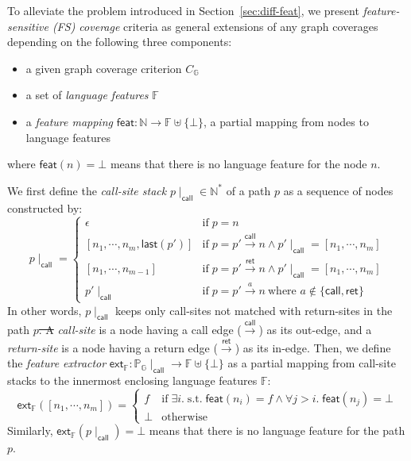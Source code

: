 \documentclass[acmsmall,review,screen]{acmart}
\newcommand{\tif}{\text{if} \; }
\newcommand{\telse}{\text{otherwise}}
\newcommand{\tst}{{\; \text{s.t.} \; }}
\newcommand{\name}[1]{\textsf{#1}}
\newcommand{\graph}{\mathbb{G}}
\newcommand{\nodeset}{\mathbb{N}}
\newcommand{\node}{n}
\newcommand{\edge}[1]{\xrightarrow{#1}}
\newcommand{\call}{\edge{\name{call}}}
\newcommand{\ret}{\edge{\name{ret}}}
\newcommand{\annot}{a}
\newcommand{\patset}[1]{\mathbb{P}_{#1}}
\newcommand{\pat}{p}
\newcommand{\getlast}{\name{last}}
\newcommand{\cov}[1]{C_{#1}}
\newcommand{\featset}{\mathbb{F}}
\newcommand{\feat}{f}
\newcommand{\featmap}{\name{feat}}
\newcommand{\extfeat}{\name{ext}_\featset}
\newcommand{\css}[1]{{#1}\!\mid_{\name{call}}}
\providecommand{\DIFaddtex}[1]{{\protect\color{blue}\uwave{#1}}} %
\providecommand{\DIFdeltex}[1]{{\protect\color{red}\sout{#1}}}                      %
\providecommand{\DIFaddbegin}{} %
\providecommand{\DIFaddend}{} %
\providecommand{\DIFdelbegin}{} %
\providecommand{\DIFdelend}{} %
\providecommand{\DIFadd}[1]{\texorpdfstring{\DIFaddtex{#1}}{#1}} %
\providecommand{\DIFdel}[1]{\texorpdfstring{\DIFdeltex{#1}}{}} %
\newcommand{\DIFscaledelfig}{0.5}
\newlength{\DIFdelgraphicswidth} %
\newlength{\DIFdelgraphicsheight} %
\newcommand{\DIFaddincludegraphics}[2][]{{\color{blue}\fbox{\DIFOincludegraphics[#1]{#2}}}} %
\newcommand{\DIFdelincludegraphics}[2][]{%
\sbox{\DIFdelgraphicsbox}{\DIFOincludegraphics[#1]{#2}}%
\settoboxwidth{\DIFdelgraphicswidth}{\DIFdelgraphicsbox} %
\settoboxtotalheight{\DIFdelgraphicsheight}{\DIFdelgraphicsbox} %
\scalebox{\DIFscaledelfig}{%
\parbox[b]{\DIFdelgraphicswidth}{\usebox{\DIFdelgraphicsbox}\\[-\baselineskip] \rule{\DIFdelgraphicswidth}{0em}}\llap{\resizebox{\DIFdelgraphicswidth}{\DIFdelgraphicsheight}{%
\setlength{\unitlength}{\DIFdelgraphicswidth}%
\begin{picture}(1,1)%
\thicklines\linethickness{2pt} %
{\color[rgb]{1,0,0}\put(0,0){\framebox(1,1){}}}%
{\color[rgb]{1,0,0}\put(0,0){\line( 1,1){1}}}%
{\color[rgb]{1,0,0}\put(0,1){\line(1,-1){1}}}%
\end{picture}%
}\hspace*{3pt}}} %
} %
\DeclareRobustCommand{\DIFaddbegin}{\DIFOaddbegin \let\includegraphics\DIFaddincludegraphics} %
\DeclareRobustCommand{\DIFaddend}{\DIFOaddend \let\includegraphics\DIFOincludegraphics} %
\DeclareRobustCommand{\DIFdelbegin}{\DIFOdelbegin \let\includegraphics\DIFdelincludegraphics} %
\DeclareRobustCommand{\DIFdelend}{\DIFOaddend \let\includegraphics\DIFOincludegraphics} %
\begin{document}
To alleviate the problem introduced in Section~\ref{sec:diff-feat}, we present
\textit{feature-sensitive (FS) coverage} criteria as general extensions of any
graph coverages depending on the following three components:
%
\begin{itemize}
  \item a given graph coverage criterion $\cov{\graph}$
  \item a set of \textit{language features} $\featset$
  \item a \textit{feature mapping} $\featmap: \nodeset \rightarrow \featset
    \uplus \{ \bot \}$, a partial mapping from nodes to language features
\end{itemize}
%
where $\featmap(\node) = \bot$ means that there is no language feature for the
node $\node$.


We first define the \textit{call-site stack} $\css{\pat} \in \nodeset^*$ of a
path $\pat$ as a sequence of nodes constructed by:
\begin{equation}\label{equ:css}
  \css{\pat} = \left\{
    \begin{array}{ll}
      \epsilon &
      \tif \pat = \node\\

      {[\node_1, \cdots, \node_m, \getlast(\pat')]} &
      \tif \pat = \pat' \call \node \wedge
      \css{\pat'} = [\node_1, \cdots, \node_m]\\

      {[\node_1, \cdots, \node_{m-1}]} &
      \tif \pat = \pat' \ret \node \wedge
      \css{\pat'} = [\node_1, \cdots, \node_m]\\

      \css{\pat'} &
      \tif \pat = \pat' \edge{\annot} \node\ \mbox{where } \annot
                    \not\in \{ \name{call}, \name{ret} \}

    \end{array}
  \right.
\end{equation}
In other words, $\css{\pat}$ keeps only call-sites not matched with return-sites
in the path $\pat$\DIFdelbegin \DIFdel{.  A }\DIFdelend \DIFaddbegin \DIFadd{;  a }\DIFaddend \textit{call-site} is a node having a call edge ($\call$)
as its out-edge, and a \textit{return-site} is a node having a return edge
($\ret$) as its in-edge.
%
Then, we define the \textit{feature extractor} $\extfeat: \css{\patset{\graph}}
\rightarrow \featset \uplus \{ \bot \}$ as a partial mapping from call-site
stacks to the innermost enclosing language features $\featset$:
\begin{equation}\label{equ:extfeat}
  \extfeat([\node_1, \cdots, \node_m]) = \left\{
    \begin{array}{ll}
      \feat & \tif
      \exists i. \tst \featmap(\node_i) = \feat \wedge
      \forall j > i. \; \featmap(\node_j) = \bot
      \\

      \bot & \telse
    \end{array}
  \right.
\end{equation}
%
Similarly, $\extfeat(\css{\pat}) = \bot$ means that there is no language feature
for the path $\pat$.
\end{document}
